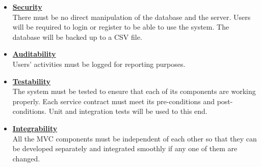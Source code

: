 \documentclass[a4paper,12pt]{article}
\begin{document}
\begin{itemize}
		\item{\bfseries \underline{Security}}\\[0.4cm]
		There must be no direct manipulation of the database and the server. Users will be required to login or register to be 			able to use the system. The database will be backed up to a CSV file.
		
		\item{\bfseries \underline{Auditability}}\\[0.4cm]
		Users' activities must be logged for reporting purposes.
		
		\item{\bfseries \underline{Testability}}\\[0.4cm]
		The system must be tested to ensure that each of its components are working properly. Each service contract must 			meet its pre-conditions and post-conditions. Unit and integration tests will be used to this end.
		
		\item{\bfseries \underline{Integrability}}\\[0.4cm]
		All the MVC components must be independent of each other so that they can be developed separately and integrated 			smoothly if any one of them are changed.
\end{itemize}

\end{document}
